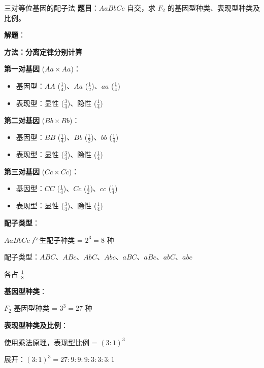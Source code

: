 \documentclass[a4paper,11pt]{ctexart}
\begin{document}
\begin{examplebox}{三对等位基因的配子法}
\textbf{题目}：$AaBbCc$ 自交，求 $F_2$ 的基因型种类、表现型种类及比例。

\textbf{解题}：

\textbf{方法：分离定律分别计算}

\textbf{第一对基因} ($Aa \times Aa$)：
\begin{itemize}[leftmargin=2em]
    \item 基因型：$AA$ ($\frac{1}{4}$)、$Aa$ ($\frac{1}{2}$)、$aa$ ($\frac{1}{4}$)
    \item 表现型：显性 ($\frac{3}{4}$)、隐性 ($\frac{1}{4}$)
\end{itemize}

\textbf{第二对基因} ($Bb \times Bb$)：
\begin{itemize}[leftmargin=2em]
    \item 基因型：$BB$ ($\frac{1}{4}$)、$Bb$ ($\frac{1}{2}$)、$bb$ ($\frac{1}{4}$)
    \item 表现型：显性 ($\frac{3}{4}$)、隐性 ($\frac{1}{4}$)
\end{itemize}

\textbf{第三对基因} ($Cc \times Cc$)：
\begin{itemize}[leftmargin=2em]
    \item 基因型：$CC$ ($\frac{1}{4}$)、$Cc$ ($\frac{1}{2}$)、$cc$ ($\frac{1}{4}$)
    \item 表现型：显性 ($\frac{3}{4}$)、隐性 ($\frac{1}{4}$)
\end{itemize}

\textbf{配子类型}：

$AaBbCc$ 产生配子种类 = $2^3 = 8$ 种

配子类型：$ABC$、$ABc$、$AbC$、$Abc$、$aBC$、$aBc$、$abC$、$abc$

各占 $\frac{1}{8}$

\textbf{基因型种类}：

$F_2$ 基因型种类 = $3^3 = 27$ 种

\textbf{表现型种类及比例}：

使用乘法原理，表现型比例 = $(3:1)^3$

展开：$(3:1)^3 = 27:9:9:9:3:3:3:1$


\end{examplebox}
\end{document}
